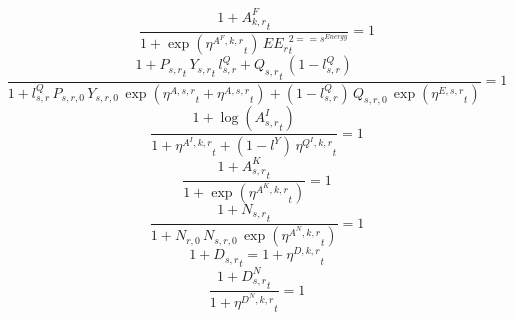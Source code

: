 \noindent[name= `sector TFP final demand 2 1']
\begin{dmath}
\frac{1+{{A^{F}_{k,r}}}_{t}}{1+\exp\left({{\eta^{A^F,k,r}}}_{t}\right)\, {{EE_r}}_{t}^{2=={{s^{Energy}}}}}=1
\end{dmath}
\noindent[name= `sector TFP 2 1']
\begin{dmath}
\frac{1+{{P_{s,r}}}_{t}\, {{Y_{s,r}}}_{t}\, {{l^{Q}_{s,r}}}+{{Q_{s,r}}}_{t}\, \left(1-{{l^{Q}_{s,r}}}\right)}{1+{{l^{Q}_{s,r}}}\, {{P_{s,r,0}}}\, {{Y_{s,r,0}}}\, \exp\left({{\eta^{A,s,r}}}_{t}+{{\eta^{A,s,r}}}_{t}\right)+\left(1-{{l^{Q}_{s,r}}}\right)\, {{Q_{s,r,0}}}\, \exp\left({{\eta^{E,s,r}}}_{t}\right)}=1
\end{dmath}
\noindent[name= `intermediate input productivity 2 1']
\begin{dmath}
\frac{1+\log\left({{A^{I}_{s,r}}}_{t}\right)}{1+{{\eta^{A^{I},k,r}}}_{t}+\left(1-{{l^{Y}}}\right)\, {{\eta^{Q^{I},k,r}}}_{t}}=1
\end{dmath}
\noindent[name= `capital productivity shock 2 1']
\begin{dmath}
\frac{1+{{A^{K}_{s,r}}}_{t}}{1+\exp\left({{\eta^{A^{K},k,r}}}_{t}\right)}=1
\end{dmath}
\noindent[name= `exogenous labour input 2 1']
\begin{dmath}
\frac{1+{{N_{s,r}}}_{t}}{1+{{N_{r,0}}}\, {{N_{s,r,0}}}\, \exp\left({{\eta^{A^{N},k,r}}}_{t}\right)}=1
\end{dmath}
\noindent[name= `TFP damage 2 1']
\begin{dmath}
1+{{D_{s,r}}}_{t}=1+{{\eta^{D,k,r}}}_{t}
\end{dmath}
\noindent[name= `labour damage 2 1']
\begin{dmath}
\frac{1+{{D^N_{s,r}}}_{t}}{1+{{\eta^{D^{N},k,r}}}_{t}}=1
\end{dmath}
\noindent[name= `capital damage 2 1']
